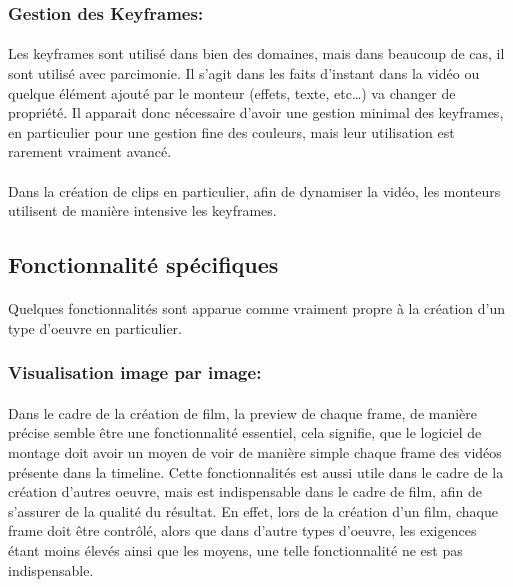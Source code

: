     \subsubsection{Gestion des Keyframes:}
      \paragraph{}
        Les keyframes sont utilisé dans bien des domaines, mais dans beaucoup de cas, il sont
        utilisé avec parcimonie. Il s'agit dans les faits d'instant dans la vidéo ou quelque
        élément ajouté par le monteur (effets, texte, etc\ldots) va changer de propriété. Il
        apparait donc nécessaire d'avoir une gestion minimal des keyframes,
        en particulier pour une gestion fine des couleurs, mais leur utilisation est
        rarement vraiment avancé.

      \paragraph{}
        Dans la création de clips en particulier, afin de dynamiser la vidéo,
        les monteurs utilisent de manière intensive les keyframes.

  \subsection{Fonctionnalité spécifiques}

    \paragraph{}
      Quelques fonctionnalités sont apparue comme vraiment propre à la création
      d'un type d'oeuvre en particulier.

    \subsubsection{Visualisation image par image:}
      \paragraph{}
        Dans le cadre de la création de film, la preview de chaque frame,
        de manière précise semble être une fonctionnalité essentiel,
        cela signifie, que le logiciel de montage doit avoir un moyen de
        voir de manière simple chaque frame des vidéos présente dans la
        timeline. Cette fonctionnalités est aussi utile dans le cadre de
        la création d'autres oeuvre, mais est indispensable dans le cadre
        de film, afin de s'assurer de la qualité du résultat. En effet,
        lors de la création d'un film, chaque frame doit être contrôlé,
        alors que dans d'autre types d'oeuvre, les exigences étant moins
        élevés ainsi que les moyens, une telle fonctionnalité ne est pas
        indispensable.

